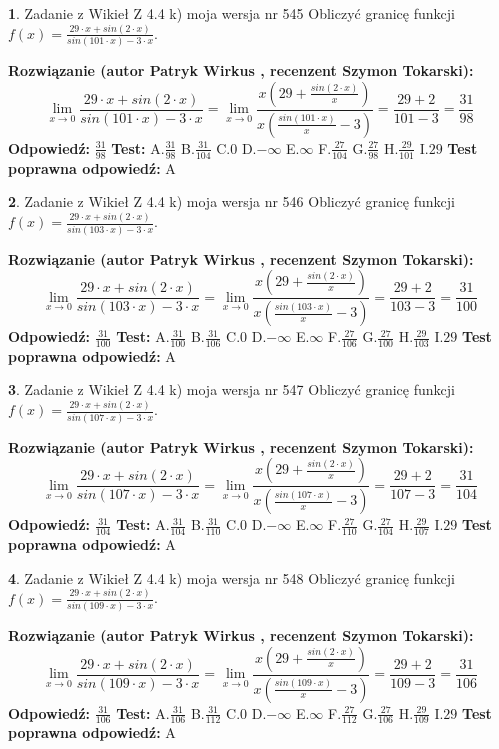 \documentclass[12pt, a4paper]{article}
\theoremstyle{definition} %
\newtheorem{zad}{}
\newcommand{\zadStart}[1]{\begin{zad}#1\newline}
\newcommand{\zadStop}{\end{zad}}
\newcommand{\rozwStart}[2]{\noindent \textbf{Rozwiązanie (autor #1 , recenzent #2): }\newline}
\newcommand{\rozwStop}{\newline}
\newcommand{\odpStart}{\noindent \textbf{Odpowiedź:}\newline}
\newcommand{\odpStop}{\newline}
\newcommand{\testStart}{\noindent \textbf{Test:}\newline}
\newcommand{\testStop}{\newline}
\newcommand{\kluczStart}{\noindent \textbf{Test poprawna odpowiedź:}\newline}
\newcommand{\kluczStop}{\newline}
\begin{document}
\zadStart{Zadanie z Wikieł Z 4.4 k) moja wersja nr 545}
Obliczyć granicę funkcji $f(x)=\frac{29\cdot x +sin(2\cdot x)}{sin(101\cdot x) -3\cdot x}$.
\zadStop
\rozwStart{Patryk Wirkus}{Szymon Tokarski}
$$\lim\limits_{x\to 0}\frac{29\cdot x +sin(2\cdot x)}{sin(101\cdot x) -3\cdot x}
=\lim\limits_{x\to 0}\frac{x(29+\frac{sin(2\cdot x)}{x})}{x(\frac{sin(101\cdot x)}{x}-3)}
=\frac{29+2}{101-3} = \frac{31}{98}$$
\rozwStop
\odpStart
$\frac{31}{98}$
\odpStop
\testStart
A.$\frac{31}{98}$
B.$\frac{31}{104}$
C.$0$
D.$-\infty$
E.$\infty$
F.$\frac{27}{104}$
G.$\frac{27}{98}$
H.$\frac{29}{101}$
I.$29$
\testStop
\kluczStart
A
\kluczStop



\zadStart{Zadanie z Wikieł Z 4.4 k) moja wersja nr 546}
Obliczyć granicę funkcji $f(x)=\frac{29\cdot x +sin(2\cdot x)}{sin(103\cdot x) -3\cdot x}$.
\zadStop
\rozwStart{Patryk Wirkus}{Szymon Tokarski}
$$\lim\limits_{x\to 0}\frac{29\cdot x +sin(2\cdot x)}{sin(103\cdot x) -3\cdot x}
=\lim\limits_{x\to 0}\frac{x(29+\frac{sin(2\cdot x)}{x})}{x(\frac{sin(103\cdot x)}{x}-3)}
=\frac{29+2}{103-3} = \frac{31}{100}$$
\rozwStop
\odpStart
$\frac{31}{100}$
\odpStop
\testStart
A.$\frac{31}{100}$
B.$\frac{31}{106}$
C.$0$
D.$-\infty$
E.$\infty$
F.$\frac{27}{106}$
G.$\frac{27}{100}$
H.$\frac{29}{103}$
I.$29$
\testStop
\kluczStart
A
\kluczStop



\zadStart{Zadanie z Wikieł Z 4.4 k) moja wersja nr 547}
Obliczyć granicę funkcji $f(x)=\frac{29\cdot x +sin(2\cdot x)}{sin(107\cdot x) -3\cdot x}$.
\zadStop
\rozwStart{Patryk Wirkus}{Szymon Tokarski}
$$\lim\limits_{x\to 0}\frac{29\cdot x +sin(2\cdot x)}{sin(107\cdot x) -3\cdot x}
=\lim\limits_{x\to 0}\frac{x(29+\frac{sin(2\cdot x)}{x})}{x(\frac{sin(107\cdot x)}{x}-3)}
=\frac{29+2}{107-3} = \frac{31}{104}$$
\rozwStop
\odpStart
$\frac{31}{104}$
\odpStop
\testStart
A.$\frac{31}{104}$
B.$\frac{31}{110}$
C.$0$
D.$-\infty$
E.$\infty$
F.$\frac{27}{110}$
G.$\frac{27}{104}$
H.$\frac{29}{107}$
I.$29$
\testStop
\kluczStart
A
\kluczStop



\zadStart{Zadanie z Wikieł Z 4.4 k) moja wersja nr 548}
Obliczyć granicę funkcji $f(x)=\frac{29\cdot x +sin(2\cdot x)}{sin(109\cdot x) -3\cdot x}$.
\zadStop
\rozwStart{Patryk Wirkus}{Szymon Tokarski}
$$\lim\limits_{x\to 0}\frac{29\cdot x +sin(2\cdot x)}{sin(109\cdot x) -3\cdot x}
=\lim\limits_{x\to 0}\frac{x(29+\frac{sin(2\cdot x)}{x})}{x(\frac{sin(109\cdot x)}{x}-3)}
=\frac{29+2}{109-3} = \frac{31}{106}$$
\rozwStop
\odpStart
$\frac{31}{106}$
\odpStop
\testStart
A.$\frac{31}{106}$
B.$\frac{31}{112}$
C.$0$
D.$-\infty$
E.$\infty$
F.$\frac{27}{112}$
G.$\frac{27}{106}$
H.$\frac{29}{109}$
I.$29$
\testStop
\kluczStart
A
\kluczStop
\end{document}
